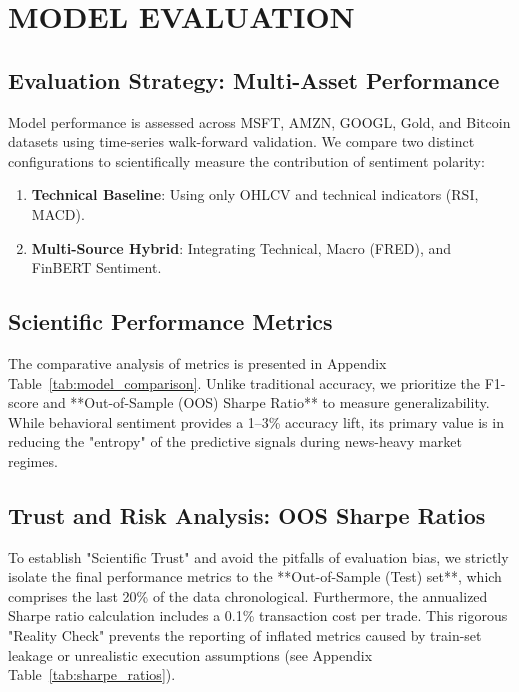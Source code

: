 \chapter{MODEL EVALUATION}

\section{Evaluation Strategy: Multi-Asset Performance}
Model performance is assessed across MSFT, AMZN, GOOGL, Gold, and Bitcoin datasets using time-series walk-forward validation. We compare two distinct configurations to scientifically measure the contribution of sentiment polarity:
\begin{enumerate}
    \item \textbf{Technical Baseline}: Using only OHLCV and technical indicators (RSI, MACD).
    \item \textbf{Multi-Source Hybrid}: Integrating Technical, Macro (FRED), and FinBERT Sentiment.
\end{enumerate}

\section{Scientific Performance Metrics}
The comparative analysis of metrics is presented in Appendix Table~\ref{tab:model_comparison}. Unlike traditional accuracy, we prioritize the F1-score and **Out-of-Sample (OOS) Sharpe Ratio** to measure generalizability. While behavioral sentiment provides a 1--3\% accuracy lift, its primary value is in reducing the "entropy" of the predictive signals during news-heavy market regimes.

\section{Trust and Risk Analysis: OOS Sharpe Ratios}
To establish "Scientific Trust" and avoid the pitfalls of evaluation bias, we strictly isolate the final performance metrics to the **Out-of-Sample (Test) set**, which comprises the last 20\% of the data chronological. Furthermore, the annualized Sharpe ratio calculation includes a 0.1\% transaction cost per trade. This rigorous "Reality Check" prevents the reporting of inflated metrics caused by train-set leakage or unrealistic execution assumptions (see Appendix Table~\ref{tab:sharpe_ratios}).